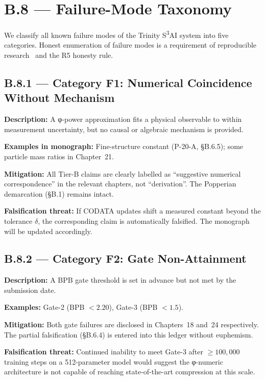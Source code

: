 \section*{B.8 — Failure-Mode Taxonomy}
\label{sec:failure-modes}

\noindent We classify all known failure modes of the Trinity S\textsuperscript{3}AI
system into five categories.  Honest enumeration of failure modes is a requirement
of reproducible research~\cite{pineau2021improving} and the R5 honesty rule.

\subsection*{B.8.1 — Category F1: Numerical Coincidence Without Mechanism}

\textbf{Description:} A φ-power approximation fits a physical observable to
within measurement uncertainty, but no causal or algebraic mechanism is provided.

\textbf{Examples in monograph:} Fine-structure constant (P-20-A, §B.6.5);
some particle mass ratios in Chapter~21.

\textbf{Mitigation:} All Tier-B claims are clearly labelled as ``suggestive
numerical correspondence'' in the relevant chapters, not ``derivation''.
The Popperian demarcation (§B.1) remains intact.

\textbf{Falsification threat:} If CODATA updates shift a measured constant
beyond the tolerance $\delta$, the corresponding claim is automatically
falsified.  The monograph will be updated accordingly.

\subsection*{B.8.2 — Category F2: Gate Non-Attainment}

\textbf{Description:} A BPB gate threshold is set in advance but not met by
the submission date.

\textbf{Examples:} Gate-2 (BPB $< 2.20$), Gate-3 (BPB $< 1.5$).

\textbf{Mitigation:} Both gate failures are disclosed in Chapters~18 and~24
respectively.  The partial falsification (§B.6.4) is entered into this ledger
without euphemism.

\textbf{Falsification threat:} Continued inability to meet Gate-3 after
$\geq 100{,}000$ training steps on a 512-parameter model would suggest the
φ-numeric architecture is not capable of reaching state-of-the-art compression
at this scale.

